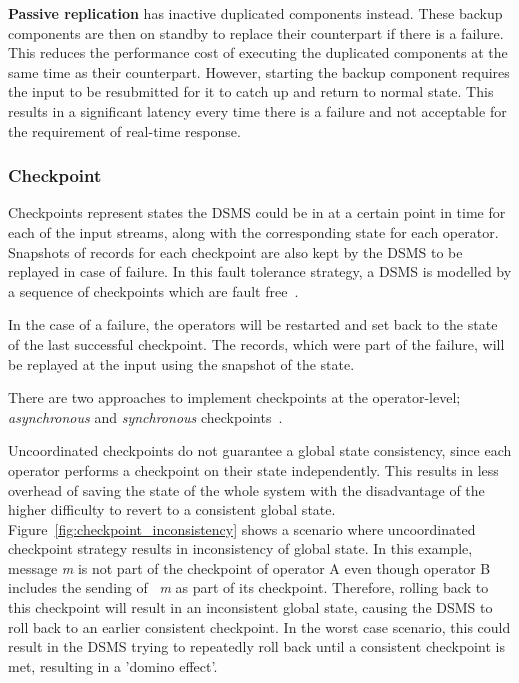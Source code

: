 \textbf{Passive replication} has inactive duplicated components instead. These backup
components are then on standby to replace their counterpart if there is a failure. This 
reduces the performance cost of executing the duplicated components at the same 
time as their counterpart. However, starting the backup component requires the input 
to be resubmitted for it to catch up and return to normal state. This results in a significant 
latency every time there is a failure and not acceptable for the requirement of real-time response. 


\subsubsection{Checkpoint}

Checkpoints represent states the DSMS could be in at a certain point in 
time for each of the input streams, along with the corresponding 
state for each operator. Snapshots of records for each checkpoint are also kept 
by the DSMS to be replayed in case of failure. 
In this fault tolerance strategy, a DSMS is modelled by a sequence of 
checkpoints which are fault free~\cite{fault_tolerance_dsms}. 

In the case of a failure, the operators will be restarted and set back to the state of the 
last successful checkpoint. The records, which were part of the failure, will be replayed
at the input using the snapshot of the state. 

There are two approaches to implement checkpoints at the operator-level; 
\emph{asynchronous} and \emph{synchronous} checkpoints~\cite{fault_tolerance_dsms}.

Uncoordinated checkpoints do not guarantee a global state consistency, since 
each operator performs a checkpoint on their state independently. This results 
in less overhead of saving the state of the whole system with the disadvantage of the higher 
difficulty to revert to a consistent global state.
Figure~\ref{fig:checkpoint_inconsistency}
shows a scenario where uncoordinated checkpoint strategy results in inconsistency of 
global state. In this example, message \emph{m} is not part of the checkpoint of operator 
A even though operator B includes the sending of ~\emph{m} as part of its checkpoint. Therefore, 
rolling back to this checkpoint will result in an inconsistent global state, causing the 
DSMS to roll back to an earlier consistent checkpoint. In the worst case scenario, this could result 
in the DSMS trying to repeatedly roll back until a consistent checkpoint is met, 
resulting in a 'domino effect'.  


